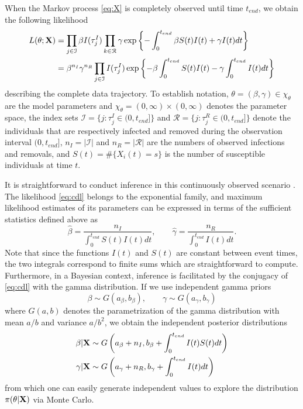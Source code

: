 \documentclass[11pt]{article}
\begin{document}
	When the Markov process \eqref{eq:X} is completely observed until time $t_{end}$, we obtain the following likelihood \cite{Streftaris.2002}
	\begin{align}
		L(\theta; \mathbf{X})
		& = \prod_{j \in \mathcal{I}} \beta I(\tau^I_j) \prod_{k \in \mathcal{R}} \gamma \exp\left\lbrace - \int_{0}^{t_{end}}\beta S(t)I(t) + \gamma I(t) dt \right\rbrace  \nonumber \\
		\label{eq:cdl}
		& = \beta^{n_I} \gamma^{n_R}\prod_{j \in \mathcal{I}} I(\tau^I_j) \exp\left\lbrace - \beta \int_{0}^{t_{end}} S(t)I(t) - \gamma \int_{0}^{t_{end}} I(t) dt \right\rbrace
	\end{align}
	describing the complete data trajectory.
	To establish notation,
	$\theta = (\beta, \gamma) \in \chi_{\theta}$ are the model parameters 
	and $\chi_{\theta} = (0, \infty) \times (0, \infty)$ denotes the parameter space, 
	the index sets $\mathcal{I} = \{j: \tau^I_j \in (0, t_{end}]\}$ and $\mathcal{R} = \{j: \tau^R_j \in (0, t_{end}]\}$ denote the individuals that are respectively infected and removed during the observation interval $(0, t_{end}]$,
	$n_I = |\mathcal{I}|$ and $n_R = |\mathcal{R}|$ are the numbers of observed infections and removals,
	and	$S(t) = \#\{X_i(t) = s\}$ is the number of susceptible individuals at time $t$.
	
	It is straightforward to conduct inference in this continuously observed scenario \cite{Guttorp.2018}. The likelihood \eqref{eq:cdl} belongs to the exponential family, and maximum likelihood estimates of its parameters can be expressed in terms of the sufficient statistics defined above as 
	$$
	\hat{\beta} = \dfrac{n_I}{ \int_{0}^{t_{end}} S(t)I(t)dt}, \qquad \hat{\gamma} = \dfrac{n_R}{ \int_{0}^{t_{end}} I(t)dt}.
	$$
	Note that since the functions $I(t)$ and $S(t)$ are constant between event times, the two integrals correspond to finite sums which are straightforward to compute.
	Furthermore, in a Bayesian context, inference is facilitated by the conjugacy of \eqref{eq:cdl} with the gamma distribution. If we use independent gamma priors
	\begin{equation}
		\label{eq:pri}
		\beta \sim G(a_{\beta}, b_{\beta}), \qquad \gamma \sim G(a_{\gamma}, b_{\gamma})
	\end{equation}
	where $G(a,b)$ denotes the parametrization of the gamma distribution with mean $a/b$ and variance $a/b^2$, we obtain the independent posterior distributions
	\begin{align}
		\label{eq:posterior_theta}
		\beta | \mathbf{X} & \sim G\left( a_{\beta} + n_I , b_{\beta} + \int_{0}^{t_{end}} I(t)S(t) dt\right) \\
		\gamma | \mathbf{X} & \sim G\left( a_{\gamma} + n_R, b_{\gamma} + \int_{0}^{t_{end}} I(t) dt\right)
	\end{align}
	from which one can easily generate independent values to explore the distribution $\pi(\theta|\mathbf{X})$ via Monte Carlo.
	
\end{document}
